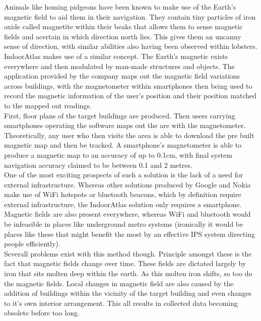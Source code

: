\documentclass[main.tex]{subfiles}
\begin{document}
 Animals like homing pidgeons have been known to make use of the Earth's magnetic field to aid them in their navigation. They contain tiny particles of iron oxide called magnetite within their beaks that allows them to sense magnetic fields and acertain in which direction north lies. This gives them an uncanny sense of direction, with similar abilities also having been observed within lobsters. \\
 
IndoorAtlas makes use of a similar concept. The Earth's magnetic exists everywhere and then modulated by man-made structures and objects. The application provided by the company maps out the magnetic field variations across buildings, with the magnetometer within smartphones then being used to record the magnetic information of the user's position and their position matched to the mapped out readings.\\
 
 First, floor plans of the target buildings are produced. Then users carrying smartphones operating the software maps out the are with the magnetometer. Theoretically, any user who then visits the area is able to download the pre built magnetic map and then be tracked. A smartphone's magnetometer is able to produce a magnetic map to an accuracy of up to 0.1cm, with final system navigation accuracy claimed to be between 0.1 and 2 metres. \\
 
 One of the most exciting prospects of such a solution is the lack of a need for external infrastructure. Whereas other solutions produced by Google and Nokia make use of WiFi hotspots or bluetooth beacons, which by definition require external infrastructure, the IndoorAtlas solution only requires a smartphone. Magnetic fields are also present everywhere, whereas WiFi and bluetooth would be infeasible in places like underground metro systems (ironically it would be places like these that might benefit the most by an effective IPS system directing people efficiently).\\
 
 Severall problems exist with this method though. Principle amongst these is the fact that magnetic fields change over time. These fields are dictated largely by iron that sits molten deep within the earth. As this molten iron shifts, so too do the magnetic fields. Local changes in magnetic field are also caused by the addition of buildings within the vicinity of the target building and even changes to it's own interior arrangement. This all results in collected data becoming obsolete before too long.\\
 
\end{document}
